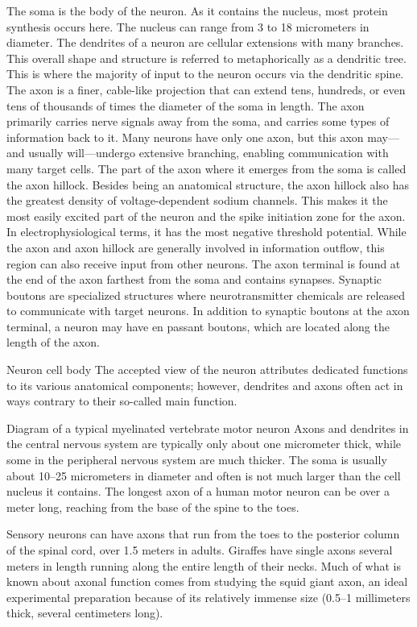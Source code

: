 \documentclass[]{book}
\begin{document}
The soma is the body of the neuron. As it contains the nucleus, most protein synthesis occurs here. The nucleus can range from 3 to 18 micrometers in diameter.
The dendrites of a neuron are cellular extensions with many branches. This overall shape and structure is referred to metaphorically as a dendritic tree. This is where the majority of input to the neuron occurs via the dendritic spine.
The axon is a finer, cable-like projection that can extend tens, hundreds, or even tens of thousands of times the diameter of the soma in length. The axon primarily carries nerve signals away from the soma, and carries some types of information back to it. Many neurons have only one axon, but this axon may---and usually will---undergo extensive branching, enabling communication with many target cells. The part of the axon where it emerges from the soma is called the axon hillock. Besides being an anatomical structure, the axon hillock also has the greatest density of voltage-dependent sodium channels. This makes it the most easily excited part of the neuron and the spike initiation zone for the axon. In electrophysiological terms, it has the most negative threshold potential.
While the axon and axon hillock are generally involved in information outflow, this region can also receive input from other neurons.
The axon terminal is found at the end of the axon farthest from the soma and contains synapses. Synaptic boutons are specialized structures where neurotransmitter chemicals are released to communicate with target neurons. In addition to synaptic boutons at the axon terminal, a neuron may have en passant boutons, which are located along the length of the axon.

Neuron cell body
The accepted view of the neuron attributes dedicated functions to its various anatomical components; however, dendrites and axons often act in ways contrary to their so-called main function.

Diagram of a typical myelinated vertebrate motor neuron
Axons and dendrites in the central nervous system are typically only about one micrometer thick, while some in the peripheral nervous system are much thicker. The soma is usually about 10--25 micrometers in diameter and often is not much larger than the cell nucleus it contains. The longest axon of a human motor neuron can be over a meter long, reaching from the base of the spine to the toes.

Sensory neurons can have axons that run from the toes to the posterior column of the spinal cord, over 1.5 meters in adults. Giraffes have single axons several meters in length running along the entire length of their necks. Much of what is known about axonal function comes from studying the squid giant axon, an ideal experimental preparation because of its relatively immense size (0.5--1 millimeters thick, several centimeters long).
\end{document}

